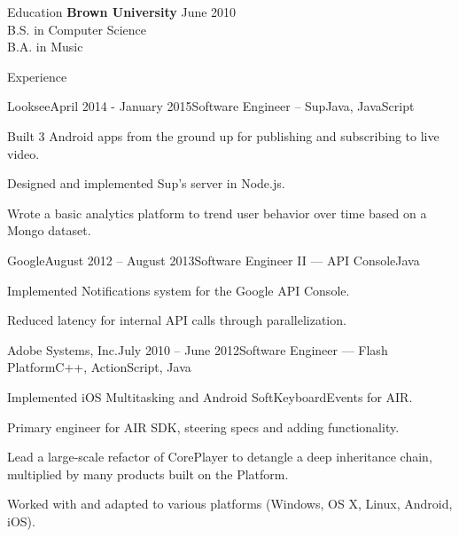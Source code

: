 \documentclass{resume} %
\begin{document}
\begin{rSection}{Education}
{\bf Brown University} \hfill {June 2010} \\ 
B.S. in Computer Science\\
B.A. in Music\smallskip \\
\end{rSection}

\begin{rSection}{Experience}

\begin{rSubsection}{Looksee}{April 2014 - January 2015}{Software Engineer -- Sup}{Java, JavaScript}
\item Built 3 Android apps from the ground up for publishing and subscribing to live video.
\item Designed and implemented Sup's server in Node.js.
\item Wrote a basic analytics platform to trend user behavior over time based on a Mongo dataset.
\end{rSubsection}
\begin{rSubsection}{Google}{August 2012 -- August 2013}{Software Engineer II --- API Console}{Java}
\item Implemented Notifications system for the Google API Console.
\item Reduced latency for internal API calls through parallelization.
\end{rSubsection}
\begin{rSubsection}{Adobe Systems, Inc.}{July 2010 -- June 2012}{Software
    Engineer --- Flash Platform}{C++, ActionScript, Java}
\item Implemented iOS Multitasking and Android SoftKeyboardEvents for AIR.
\item Primary engineer for AIR SDK, steering specs and adding functionality.
\item Lead a large-scale refactor of CorePlayer to detangle a deep inheritance
    chain, multiplied by many products built on the Platform.
\item Worked with and adapted to various platforms (Windows, OS X, Linux, Android, iOS).
\end{rSubsection}
\end{rSection}
\end{document}
